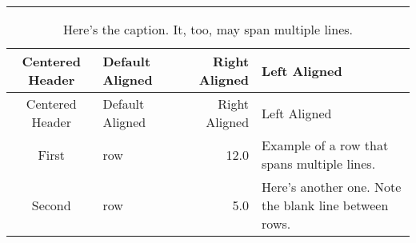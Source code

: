 \documentclass[]{article}
\begin{document}
\begin{center}\rule{0.5\linewidth}{\linethickness}\end{center}

\begin{longtable}[]{@{}clrl@{}}
\caption{Here's the caption. It, too, may span multiple
lines.}\tabularnewline
\toprule
\begin{minipage}[b]{0.15\columnwidth}\centering\strut
Centered Header\strut
\end{minipage} & \begin{minipage}[b]{0.10\columnwidth}\raggedright\strut
Default Aligned\strut
\end{minipage} & \begin{minipage}[b]{0.20\columnwidth}\raggedleft\strut
Right Aligned\strut
\end{minipage} & \begin{minipage}[b]{0.31\columnwidth}\raggedright\strut
Left Aligned\strut
\end{minipage}\tabularnewline
\midrule
\endfirsthead
\toprule
\begin{minipage}[b]{0.15\columnwidth}\centering\strut
Centered Header\strut
\end{minipage} & \begin{minipage}[b]{0.10\columnwidth}\raggedright\strut
Default Aligned\strut
\end{minipage} & \begin{minipage}[b]{0.20\columnwidth}\raggedleft\strut
Right Aligned\strut
\end{minipage} & \begin{minipage}[b]{0.31\columnwidth}\raggedright\strut
Left Aligned\strut
\end{minipage}\tabularnewline
\midrule
\endhead
\begin{minipage}[t]{0.15\columnwidth}\centering\strut
First\strut
\end{minipage} & \begin{minipage}[t]{0.10\columnwidth}\raggedright\strut
row\strut
\end{minipage} & \begin{minipage}[t]{0.20\columnwidth}\raggedleft\strut
12.0\strut
\end{minipage} & \begin{minipage}[t]{0.31\columnwidth}\raggedright\strut
Example of a row that spans multiple lines.\strut
\end{minipage}\tabularnewline
\begin{minipage}[t]{0.15\columnwidth}\centering\strut
Second\strut
\end{minipage} & \begin{minipage}[t]{0.10\columnwidth}\raggedright\strut
row\strut
\end{minipage} & \begin{minipage}[t]{0.20\columnwidth}\raggedleft\strut
5.0\strut
\end{minipage} & \begin{minipage}[t]{0.31\columnwidth}\raggedright\strut
Here's another one. Note the blank line between rows.\strut
\end{minipage}\tabularnewline
\bottomrule
\end{longtable}
\end{document}
